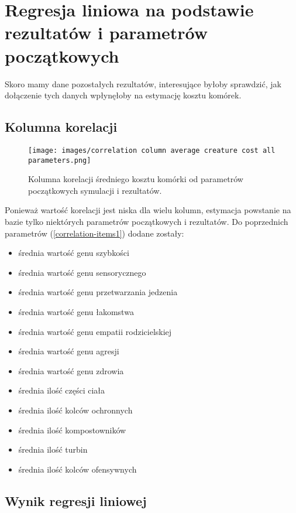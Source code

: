 \documentclass{article}
\begin{document}
\section{Regresja liniowa na podstawie rezultatów i parametrów początkowych}

Skoro mamy dane pozostałych rezultatów, interesujące byłoby sprawdzić, jak dołączenie tych danych wpłynęłoby na estymację kosztu komórek.

\subsection{Kolumna korelacji}
\begin{figure}[H]
    \centering
    \texttt{[image: images/correlation column average creature cost all parameters.png]}
    \caption{Kolumna korelacji średniego kosztu komórki od parametrów początkowych symulacji i rezultatów.}    
\end{figure}

Ponieważ wartość korelacji jest niska dla wielu kolumn, estymacja powstanie na bazie tylko niektórych parametrów początkowych i rezultatów. Do poprzednich parametrów (\ref{correlation-items1}) dodane zostały:
\begin{itemize}
    \item średnia wartość genu szybkości
    \item średnia wartość genu sensorycznego
    \item średnia wartość genu przetwarzania jedzenia
    \item średnia wartość genu łakomstwa
    \item średnia wartość genu empatii rodzicielskiej
    \item średnia wartość genu agresji
    \item średnia wartość genu zdrowia
    \item średnia ilość części ciała
    \item średnia ilość kolców ochronnych
    \item średnia ilość kompostowników
    \item średnia ilość turbin
    \item średnia ilość kolców ofensywnych
\end{itemize}

\subsection{Wynik regresji liniowej}
\end{document}
